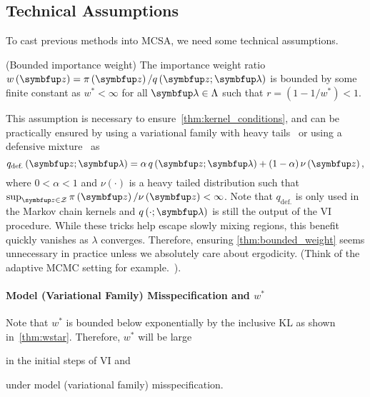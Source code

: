 \vspace{-1ex}
\subsection{Technical Assumptions}\label{section:assumption}
\vspace{-1ex}
To cast previous methods into MCSA, we need some technical assumptions.

\begin{assumption}{(Bounded importance weight)}\label{thm:bounded_weight}
  The importance weight ratio \(w\left(\vz\right) = \pi\left(\vz\right) / q\left(\vz; \vlambda\right)\) is bounded by some finite constant as \(w^* < \infty\) for all \(\vlambda \in \Lambda\) such that \(r = \left(1 - 1/w^*\right) < 1\).
\end{assumption}
\vspace{-0.05in}
This assumption is necessary to ensure~\cref{thm:kernel_conditions}, and can be practically ensured by using a variational family with heavy tails~\citep{NEURIPS2018_25db67c5} or using a defensive mixture~\citep{hesterberg_weighted_1995, holden_adaptive_2009} as
{\[
  q_{\text{def.}}\left(\vz; \vlambda \right) = \alpha \, q\left(\vz; \vlambda\right) + (1 - \alpha) \, \nu\left(\vz\right),
\]}%
where \(0 < \alpha < 1\) and \(\nu\left(\cdot\right)\) is a heavy tailed distribution such that \(\sup_{\vz \in \mathcal{Z}} \pi\left(\vz\right) / \nu\left(\vz\right) < \infty\).
Note that \(q_{\text{def.}}\) is only used in the Markov chain kernels and \(q\left(\cdot;\vlambda\right)\) is still the output of the VI procedure.
While these tricks help escape slowly mixing regions, this benefit quickly vanishes as \(\lambda\) converges.
Therefore, ensuring \cref{thm:bounded_weight} seems unnecessary in practice unless we absolutely care about ergodicity. (Think of the adaptive MCMC setting for example.~\citealt{holden_adaptive_2009, pmlr-v151-brofos22a}).

\vspace{-0.1in}
\paragraph{\textbf{Model (Variational Family) Misspecification and \(w^*\)}}
Note that \(w^*\) is bounded below exponentially by the inclusive KL as shown in~\cref{thm:wstar}.
Therefore, \(w^*\) will be large 
\begin{enumerate*}[label=\textbf{(\roman*)}]
    \item in the initial steps of VI and
    \item under model (variational family) misspecification.
\end{enumerate*}

